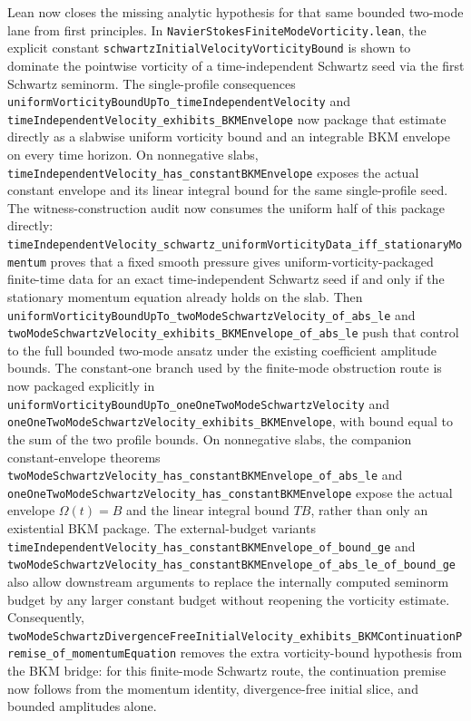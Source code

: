 \documentclass[11pt]{article}
\theoremstyle{remark}
\begin{document}
Lean now closes the missing analytic hypothesis for that same bounded two-mode
lane from first principles.  In
\texttt{NavierStokesFiniteModeVorticity.lean}, the explicit constant
\texttt{schwartzInitialVelocityVorticityBound} is shown to dominate the
pointwise vorticity of a time-independent Schwartz seed via the first Schwartz
seminorm.  The single-profile consequences
\texttt{uniformVorticityBoundUpTo\_timeIndependentVelocity} and
\texttt{timeIndependentVelocity\_exhibits\_BKMEnvelope} now package that estimate
directly as a slabwise uniform vorticity bound and an integrable BKM envelope on
every time horizon.  On nonnegative slabs,
\texttt{timeIndependentVelocity\_has\_constantBKMEnvelope} exposes the actual
constant envelope and its linear integral bound for the same single-profile
seed.  The witness-construction audit now consumes the uniform
half of this package directly:
\texttt{timeIndependentVelocity\_schwartz\_uniformVorticityData\_iff\_stationaryMomentum}
proves that a fixed smooth pressure gives uniform-vorticity-packaged finite-time
data for an exact time-independent Schwartz seed if and only if the stationary
momentum equation already holds on the slab.  Then
\texttt{uniformVorticityBoundUpTo\_twoModeSchwartzVelocity\_of\_abs\_le} and
\texttt{twoModeSchwartzVelocity\_exhibits\_BKMEnvelope\_of\_abs\_le} push that
control to the full bounded two-mode ansatz under the existing coefficient
amplitude bounds.  The constant-one branch used by the finite-mode obstruction
route is now packaged explicitly in
\texttt{uniformVorticityBoundUpTo\_oneOneTwoModeSchwartzVelocity} and
\texttt{oneOneTwoModeSchwartzVelocity\_exhibits\_BKMEnvelope}, with bound equal
to the sum of the two profile bounds.  On nonnegative slabs, the companion
constant-envelope theorems
\texttt{twoModeSchwartzVelocity\_has\_constantBKMEnvelope\_of\_abs\_le} and
\texttt{oneOneTwoModeSchwartzVelocity\_has\_constantBKMEnvelope} expose the
actual envelope \(\Omega(t)=B\) and the linear integral bound \(T B\), rather
than only an existential BKM package.  The external-budget variants
\texttt{timeIndependentVelocity\_has\_constantBKMEnvelope\_of\_bound\_ge} and
\texttt{twoModeSchwartzVelocity\_has\_constantBKMEnvelope\_of\_abs\_le\_of\_bound\_ge}
also allow downstream arguments to replace the internally computed seminorm
budget by any larger constant budget without reopening the vorticity estimate.
Consequently,
\texttt{twoModeSchwartzDivergenceFreeInitialVelocity\_exhibits\_BKMContinuationPremise\_of\_momentumEquation}
removes the extra vorticity-bound hypothesis from the BKM bridge: for this
finite-mode Schwartz route, the continuation premise now follows from the
momentum identity, divergence-free initial slice, and bounded amplitudes alone.
\end{document}
